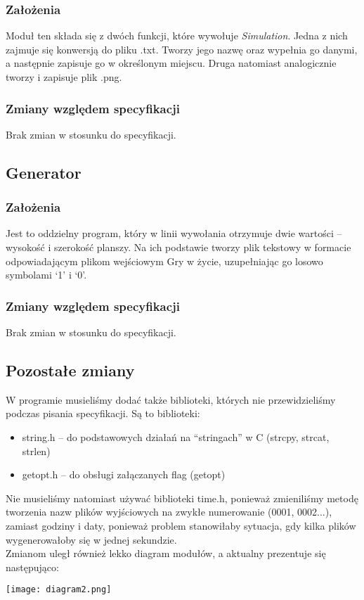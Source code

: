 \documentclass{article}
\begin{document}
\subsubsection{Założenia}
Moduł ten składa się z dwóch funkcji, które wywołuje \textit{Simulation}. Jedna z
nich zajmuje się konwersją do pliku .txt. Tworzy jego nazwę oraz wypełnia go
danymi, a następnie zapisuje go w określonym miejscu. Druga natomiast
analogicznie tworzy i zapisuje plik .png.

\subsubsection{Zmiany względem specyfikacji}
Brak zmian w stosunku do specyfikacji.

\subsection{Generator}
\subsubsection{Założenia}
Jest to oddzielny program, który w linii wywołania otrzymuje dwie wartości –
wysokość i szerokość planszy. Na ich podstawie tworzy plik tekstowy w
formacie odpowiadającym plikom wejściowym Gry w życie, uzupełniając go
losowo symbolami ‘1’ i ‘0’.

\subsubsection{Zmiany względem specyfikacji}
Brak zmian w stosunku do specyfikacji.

\subsection{Pozostałe zmiany}
W programie musieliśmy dodać także biblioteki, których nie przewidzieliśmy podczas pisania specyfikacji. Są to biblioteki:
\begin{itemize}
    \item string.h -- do podstawowych działań na ``stringach'' w C (strcpy, strcat, strlen)
    \item getopt.h -- do obsługi załączanych flag (getopt)
\end{itemize}
Nie musieliśmy natomiast używać biblioteki time.h, ponieważ zmieniliśmy metodę tworzenia nazw plików wyjściowych na zwykłe numerowanie (0001, 0002...), zamiast godziny i daty, ponieważ problem stanowiłaby sytuacja, gdy kilka plików wygenerowałoby się w jednej sekundzie.\\
Zmianom uległ również lekko diagram modułów, a aktualny prezentuje się następująco:
\begin{center}
  \texttt{[image: diagram2.png]}
\end{center}
\end{document}

